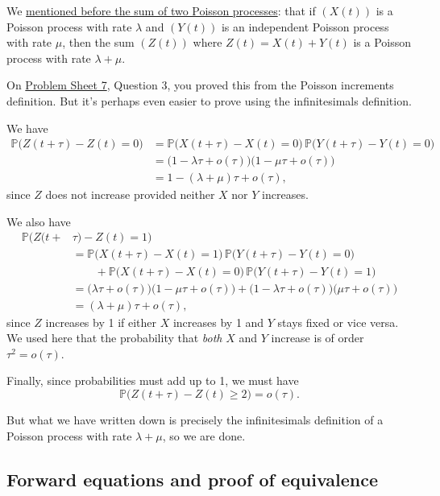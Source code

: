\documentclass[
  a4paper,
]{article}
\theoremstyle{definition}
\theoremstyle{definition}
\theoremstyle{definition}
\theoremstyle{remark}
\begin{document}
We \protect\hyperlink{summed-marked}{mentioned before the sum of two Poisson processes}: that if \((X(t))\) is a Poisson process with rate \(\lambda\) and \((Y(t))\) is an independent Poisson process with rate \(\mu\), then the sum \((Z(t))\) where \(Z(t) = X(t) + Y(t)\) is a Poisson process with rate \(\lambda + \mu\).

On \protect\hyperlink{P07}{Problem Sheet 7}, Question 3, you proved this from the Poisson increments definition. But it's perhaps even easier to prove using the infinitesimals definition.

We have
\begin{align*}\mathbb P\big( Z(t+\tau) - Z(t) = 0 \big) &= \mathbb P\big( X(t+\tau) - X(t) = 0 \big) \, \mathbb P\big( Y(t+\tau) - Y(t) = 0 \big) \\ &=\big(1 - \lambda \tau + o(\tau) \big)\big(1 - \mu \tau + o(\tau) \big) \\
&= 1 - (\lambda + \mu)\tau + o(\tau) , \end{align*}
since \(Z\) does not increase provided neither \(X\) nor \(Y\) increases.

We also have
\begin{align*}\mathbb P\big( Z(t+{}&\tau) - Z(t) = 1 \big) \\
&= \mathbb P\big( X(t+\tau) - X(t) = 1 \big) \, \mathbb P\big( Y(t+\tau) - Y(t) = 0 \big) \\ &\qquad {}+ \mathbb P\big( X(t+\tau) - X(t) = 0 \big) \, \mathbb P\big( Y(t+\tau) - Y(t) = 1 \big) \\
&= \big(\lambda \tau + o(\tau) \big)\big(1 - \mu \tau + o(\tau) \big) + \big(1 - \lambda \tau + o(\tau) \big)\big(\mu \tau + o(\tau) \big) \\
&= (\lambda + \mu)\tau + o(\tau) , \end{align*}
since \(Z\) increases by 1 if either \(X\) increases by 1 and \(Y\) stays fixed or vice versa. We used here that the probability that \emph{both} \(X\) and \(Y\) increase is of order \(\tau^2 = o(\tau)\).

Finally, since probabilities must add up to 1, we must have
\[ \mathbb P\big( Z(t+\tau) - Z(t) \geq 2 \big) =  o(\tau) . \]

But what we have written down is precisely the infinitesimals definition of a Poisson process with rate \(\lambda + \mu\), so we are done.

\hypertarget{forward}{%
\subsection{Forward equations and proof of equivalence}\label{forward}}
\end{document}
